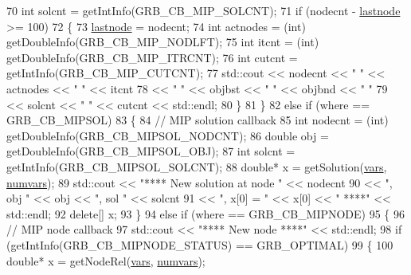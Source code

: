 \begin{DoxyCode}
70           \textcolor{keywordtype}{int} solcnt = getIntInfo(GRB\_CB\_MIP\_SOLCNT);
71           \textcolor{keywordflow}{if} (nodecnt - \hyperlink{classmyCallback_a87d5f6d39e4319e13798bd57a728863a}{lastnode} >= 100)
72            \{
73             \hyperlink{classmyCallback_a87d5f6d39e4319e13798bd57a728863a}{lastnode} = nodecnt;
74             \textcolor{keywordtype}{int} actnodes = (int) getDoubleInfo(GRB\_CB\_MIP\_NODLFT);
75             \textcolor{keywordtype}{int} itcnt = (int) getDoubleInfo(GRB\_CB\_MIP\_ITRCNT);
76             \textcolor{keywordtype}{int} cutcnt = getIntInfo(GRB\_CB\_MIP\_CUTCNT);
77             std::cout << nodecnt << \textcolor{stringliteral}{" "} << actnodes << \textcolor{stringliteral}{" "} << itcnt
78                       << \textcolor{stringliteral}{" "} << objbst << \textcolor{stringliteral}{" "} << objbnd << \textcolor{stringliteral}{" "}
79                       << solcnt << \textcolor{stringliteral}{" "} << cutcnt << std::endl;
80            \}
81          \}
82         \textcolor{keywordflow}{else} \textcolor{keywordflow}{if} (where == GRB\_CB\_MIPSOL)
83          \{
84           \textcolor{comment}{// MIP solution callback}
85           \textcolor{keywordtype}{int} nodecnt = (int) getDoubleInfo(GRB\_CB\_MIPSOL\_NODCNT);
86           \textcolor{keywordtype}{double} obj = getDoubleInfo(GRB\_CB\_MIPSOL\_OBJ);
87           \textcolor{keywordtype}{int} solcnt = getIntInfo(GRB\_CB\_MIPSOL\_SOLCNT);
88           \textcolor{keywordtype}{double}* x = getSolution(\hyperlink{classmyCallback_a5e9e8c33c9ed51920ee430230a91a744}{vars}, \hyperlink{classmyCallback_a4093ee09300c254ac977ad61f861f21f}{numvars});
89           std::cout << \textcolor{stringliteral}{"**** New solution at node "} << nodecnt
90                     << \textcolor{stringliteral}{", obj "} << obj << \textcolor{stringliteral}{", sol "} << solcnt
91                     << \textcolor{stringliteral}{", x[0] = "} << x[0] << \textcolor{stringliteral}{" ****"} << std::endl;
92           \textcolor{keyword}{delete}[] x;
93          \}
94         \textcolor{keywordflow}{else} \textcolor{keywordflow}{if} (where == GRB\_CB\_MIPNODE)
95          \{
96           \textcolor{comment}{// MIP node callback}
97           std::cout << \textcolor{stringliteral}{"**** New node ****"} << std::endl;
98           \textcolor{keywordflow}{if} (getIntInfo(GRB\_CB\_MIPNODE\_STATUS) == GRB\_OPTIMAL)
99            \{
100             \textcolor{keywordtype}{double}* x = getNodeRel(\hyperlink{classmyCallback_a5e9e8c33c9ed51920ee430230a91a744}{vars}, \hyperlink{classmyCallback_a4093ee09300c254ac977ad61f861f21f}{numvars});

\end{DoxyCode}
